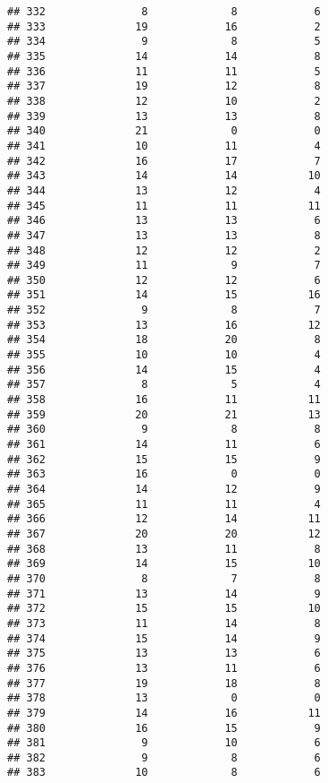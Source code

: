\documentclass[
]{article}
\begin{document}
\begin{verbatim}
## 332               8             8            6
## 333              19            16            2
## 334               9             8            5
## 335              14            14            8
## 336              11            11            5
## 337              19            12            8
## 338              12            10            2
## 339              13            13            8
## 340              21             0            0
## 341              10            11            4
## 342              16            17            7
## 343              14            14           10
## 344              13            12            4
## 345              11            11           11
## 346              13            13            6
## 347              13            13            8
## 348              12            12            2
## 349              11             9            7
## 350              12            12            6
## 351              14            15           16
## 352               9             8            7
## 353              13            16           12
## 354              18            20            8
## 355              10            10            4
## 356              14            15            4
## 357               8             5            4
## 358              16            11           11
## 359              20            21           13
## 360               9             8            8
## 361              14            11            6
## 362              15            15            9
## 363              16             0            0
## 364              14            12            9
## 365              11            11            4
## 366              12            14           11
## 367              20            20           12
## 368              13            11            8
## 369              14            15           10
## 370               8             7            8
## 371              13            14            9
## 372              15            15           10
## 373              11            14            8
## 374              15            14            9
## 375              13            13            6
## 376              13            11            6
## 377              19            18            8
## 378              13             0            0
## 379              14            16           11
## 380              16            15            9
## 381               9            10            6
## 382               9             8            6
## 383              10             8            6

\end{verbatim}
\end{document}
